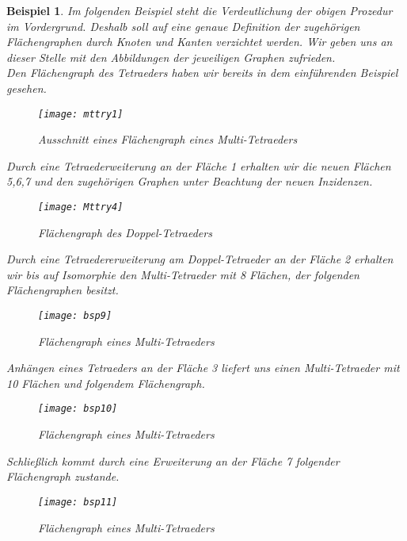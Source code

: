 \documentclass[12pt,titlepage,twoside,cleardoublepage]{article}
\theoremstyle{nummermitklammern}
\newtheorem{bsp}[temp]{Beispiel}
\newtheorem{bsp}[zahl]{Beispiel}
\numberwithin{equation}{section}
\begin{document}
\begin{bsp}
Im folgenden Beispiel steht die Verdeutlichung der obigen Prozedur im Vordergrund. Deshalb soll auf eine genaue Definition der zugehörigen Flächengraphen durch Knoten und Kanten verzichtet werden. Wir geben uns an dieser Stelle mit den Abbildungen der jeweiligen Graphen zufrieden. \\
Den Flächengraph des Tetraeders haben wir bereits in dem einführenden Beispiel gesehen.
\begin{figure}[H]
\begin{center}
\texttt{[image: mttry1]}

\end{center}
\caption{Ausschnitt eines Flächengraph eines Multi-Tetraeders}
\end{figure}
Durch eine Tetraederweiterung an der Fläche 1 erhalten wir die neuen Flächen 5,6,7 und den zugehörigen Graphen unter Beachtung der neuen Inzidenzen.
\begin{figure}[H]
\begin{center}
\texttt{[image: Mttry4]}
\end{center}
\caption{Flächengraph des Doppel-Tetraeders}
\end{figure}
Durch eine Tetraedererweiterung am Doppel-Tetraeder an der Fläche 2 erhalten wir bis auf Isomorphie den Multi-Tetraeder mit 8 Flächen, der folgenden Flächengraphen besitzt. 
\begin{figure}[H]
\begin{center}
\texttt{[image: bsp9]}
\end{center}
\caption{Flächengraph eines Multi-Tetraeders}
\end{figure}
Anhängen eines Tetraeders an der Fläche 3 liefert uns einen Multi-Tetraeder mit 10 Flächen und folgendem Flächengraph.
\begin{figure}[H]
\begin{center}
\texttt{[image: bsp10]}
\end{center}
\caption{Flächengraph eines Multi-Tetraeders}
\end{figure}
Schließlich kommt durch eine Erweiterung an der Fläche 7 folgender Flächengraph zustande.
\begin{figure}[H]
\begin{center}
\texttt{[image: bsp11]}
\end{center}
\caption{Flächengraph eines Multi-Tetraeders}
\end{figure}
\end{bsp}
\end{document}
